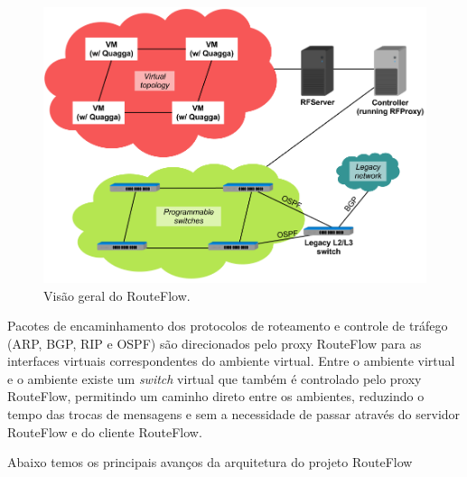 \begin{figure}[h]
\centering
\includegraphics[width=160mm]{visaoGeralRouteFlow.png}
\caption{Visão geral do RouteFlow.}
\label{fig:visaoGeralRouteFlow} 
\end{figure}


Pacotes de encaminhamento dos protocolos de roteamento 
e controle de tráfego (ARP, BGP, RIP e OSPF) são direcionados
pelo proxy RouteFlow para as interfaces virtuais correspondentes do
ambiente virtual. Entre o ambiente virtual e o ambiente existe
um \textit{switch} virtual que também é controlado pelo proxy RouteFlow,
permitindo um caminho direto entre os ambientes, reduzindo 
o tempo das trocas de mensagens e sem a necessidade de passar
através do servidor RouteFlow e do cliente RouteFlow.

Abaixo temos os principais avanços da arquitetura do projeto
RouteFlow

